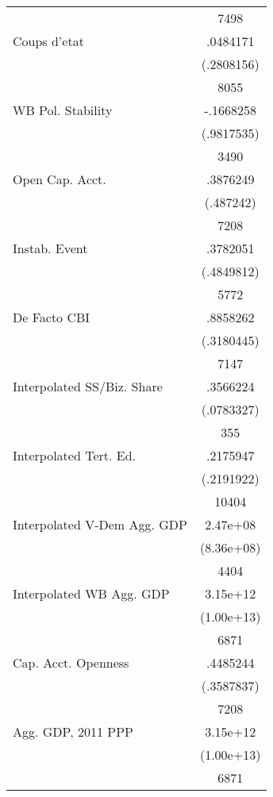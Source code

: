 {\begin{longtable}{l*{1}{c}}
                    &        7498\\
Coups d'etat        &    .0484171\\
                    &  (.2808156)\\
                    &        8055\\
WB Pol. Stability   &   -.1668258\\
                    &  (.9817535)\\
                    &        3490\\
Open Cap. Acct.     &    .3876249\\
                    &   (.487242)\\
                    &        7208\\
Instab. Event       &    .3782051\\
                    &  (.4849812)\\
                    &        5772\\
De Facto CBI        &    .8858262\\
                    &  (.3180445)\\
                    &        7147\\
Interpolated SS/Biz. Share&    .3566224\\
                    &  (.0783327)\\
                    &         355\\
Interpolated Tert. Ed.&    .2175947\\
                    &  (.2191922)\\
                    &       10404\\
Interpolated V-Dem Agg. GDP&    2.47e+08\\
                    &  (8.36e+08)\\
                    &        4404\\
Interpolated WB Agg. GDP&    3.15e+12\\
                    &  (1.00e+13)\\
                    &        6871\\
Cap. Acct. Openness &    .4485244\\
                    &  (.3587837)\\
                    &        7208\\
Agg. GDP, 2011 PPP  &    3.15e+12\\
                    &  (1.00e+13)\\
                    &        6871\\

\end{longtable}}
